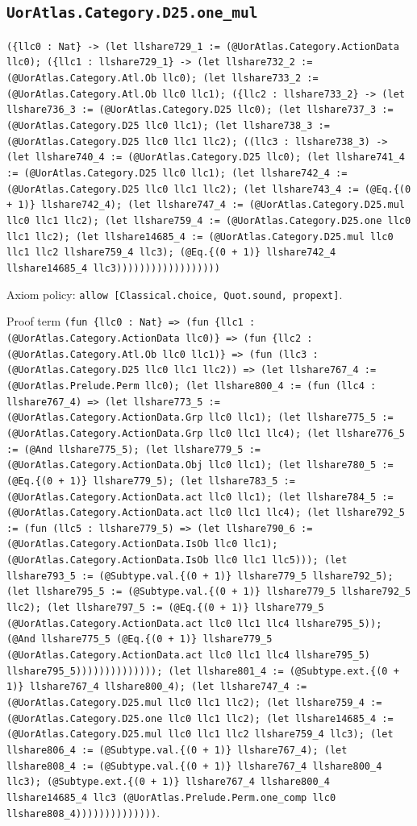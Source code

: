 \documentclass[11pt]{article}
\begin{document}
\subsection*{\texttt{UorAtlas.Category.D25.one\_mul}}
\noindent\texttt{(\{llc0 : Nat\} -> (let llshare729\_1 := (@UorAtlas.Category.ActionData llc0); (\{llc1 : llshare729\_1\} -> (let llshare732\_2 := (@UorAtlas.Category.Atl.Ob llc0); (let llshare733\_2 := (@UorAtlas.Category.Atl.Ob llc0 llc1); (\{llc2 : llshare733\_2\} -> (let llshare736\_3 := (@UorAtlas.Category.D25 llc0); (let llshare737\_3 := (@UorAtlas.Category.D25 llc0 llc1); (let llshare738\_3 := (@UorAtlas.Category.D25 llc0 llc1 llc2); ((llc3 : llshare738\_3) -> (let llshare740\_4 := (@UorAtlas.Category.D25 llc0); (let llshare741\_4 := (@UorAtlas.Category.D25 llc0 llc1); (let llshare742\_4 := (@UorAtlas.Category.D25 llc0 llc1 llc2); (let llshare743\_4 := (@Eq.\{(0 + 1)\} llshare742\_4); (let llshare747\_4 := (@UorAtlas.Category.D25.mul llc0 llc1 llc2); (let llshare759\_4 := (@UorAtlas.Category.D25.one llc0 llc1 llc2); (let llshare14685\_4 := (@UorAtlas.Category.D25.mul llc0 llc1 llc2 llshare759\_4 llc3); (@Eq.\{(0 + 1)\} llshare742\_4 llshare14685\_4 llc3))))))))))))))))))}\par
\noindent Axiom policy: \texttt{allow [Classical.choice, Quot.sound, propext]}.\par
\noindent Proof term \texttt{(fun \{llc0 : Nat\} => (fun \{llc1 : (@UorAtlas.Category.ActionData llc0)\} => (fun \{llc2 : (@UorAtlas.Category.Atl.Ob llc0 llc1)\} => (fun (llc3 : (@UorAtlas.Category.D25 llc0 llc1 llc2)) => (let llshare767\_4 := (@UorAtlas.Prelude.Perm llc0); (let llshare800\_4 := (fun (llc4 : llshare767\_4) => (let llshare773\_5 := (@UorAtlas.Category.ActionData.Grp llc0 llc1); (let llshare775\_5 := (@UorAtlas.Category.ActionData.Grp llc0 llc1 llc4); (let llshare776\_5 := (@And llshare775\_5); (let llshare779\_5 := (@UorAtlas.Category.ActionData.Obj llc0 llc1); (let llshare780\_5 := (@Eq.\{(0 + 1)\} llshare779\_5); (let llshare783\_5 := (@UorAtlas.Category.ActionData.act llc0 llc1); (let llshare784\_5 := (@UorAtlas.Category.ActionData.act llc0 llc1 llc4); (let llshare792\_5 := (fun (llc5 : llshare779\_5) => (let llshare790\_6 := (@UorAtlas.Category.ActionData.IsOb llc0 llc1); (@UorAtlas.Category.ActionData.IsOb llc0 llc1 llc5))); (let llshare793\_5 := (@Subtype.val.\{(0 + 1)\} llshare779\_5 llshare792\_5); (let llshare795\_5 := (@Subtype.val.\{(0 + 1)\} llshare779\_5 llshare792\_5 llc2); (let llshare797\_5 := (@Eq.\{(0 + 1)\} llshare779\_5 (@UorAtlas.Category.ActionData.act llc0 llc1 llc4 llshare795\_5)); (@And llshare775\_5 (@Eq.\{(0 + 1)\} llshare779\_5 (@UorAtlas.Category.ActionData.act llc0 llc1 llc4 llshare795\_5) llshare795\_5)))))))))))))); (let llshare801\_4 := (@Subtype.ext.\{(0 + 1)\} llshare767\_4 llshare800\_4); (let llshare747\_4 := (@UorAtlas.Category.D25.mul llc0 llc1 llc2); (let llshare759\_4 := (@UorAtlas.Category.D25.one llc0 llc1 llc2); (let llshare14685\_4 := (@UorAtlas.Category.D25.mul llc0 llc1 llc2 llshare759\_4 llc3); (let llshare806\_4 := (@Subtype.val.\{(0 + 1)\} llshare767\_4); (let llshare808\_4 := (@Subtype.val.\{(0 + 1)\} llshare767\_4 llshare800\_4 llc3); (@Subtype.ext.\{(0 + 1)\} llshare767\_4 llshare800\_4 llshare14685\_4 llc3 (@UorAtlas.Prelude.Perm.one\_comp llc0 llshare808\_4))))))))))))))}.\par
\end{document}
